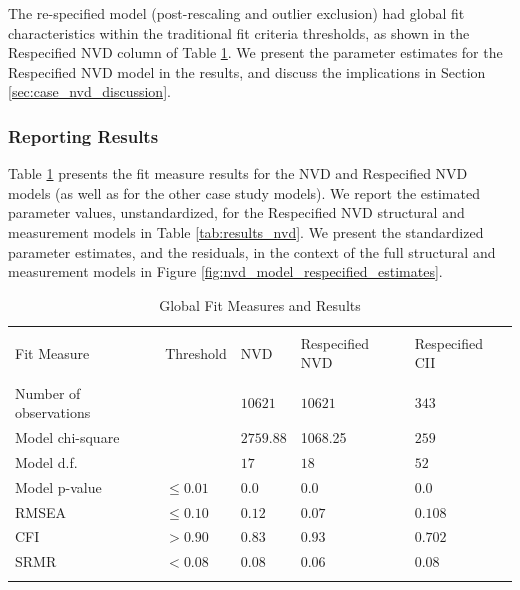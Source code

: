 The re-specified model (post-rescaling and outlier exclusion) had global fit characteristics within the traditional fit criteria thresholds, as shown in the Respecified NVD column of Table \ref{tab:results_fit_all}. We present the parameter estimates for the Respecified NVD model in the results, and discuss the implications in Section \ref{sec:case_nvd_discussion}.

\subsubsection{Reporting Results}
\label{sec:case_nvd_results}

Table \ref{tab:results_fit_all} presents the fit measure results for the NVD  and Respecified NVD models (as well as for the other case study models). We report the estimated parameter values, unstandardized, for the Respecified NVD structural and measurement models in Table \ref{tab:results_nvd}. We present the standardized parameter estimates, and the residuals, in the context of the full structural and measurement models in Figure \ref{fig:nvd_model_respecified_estimates}.

\begin{table}
	\begin{center}	
		\caption{Global Fit Measures and Results}
			\label{tab:results_fit_all}
			\begin{tabular}{p{3cm}p{1cm}|p{2cm}p{2cm}p{2cm}}
				\\[-1.8ex]\hline 
				\hline \\[-1.8ex] 
				Fit Measure & Threshold & NVD	& Respecified NVD & Respecified CII  \\
				\hline \\[-1.8ex] 				
				Number of observations &  & $10621$  & $10621$ & $343$  \\				
				Model chi-square &  & $2759.88$ & 1068.25 & $259$  \\				
				Model d.f. &  & $17$ & $18$ & $52$  \\		
				Model p-value & $\leq 0.01$ & $0.0$ & $0.0$ & $0.0$  \\
				RMSEA & $\leq 0.10$ &  $0.12$ &  $0.07$ & $0.108$   \\
				CFI & $> 0.90$ & $0.83$ & $0.93$  & $0.702$  \\
				SRMR & $< 0.08$ & $0.08$ & $0.06$ & $0.08$  \\
				\hline \\[-1.8ex] 				
			\end{tabular}
	\end{center}
\end{table}

